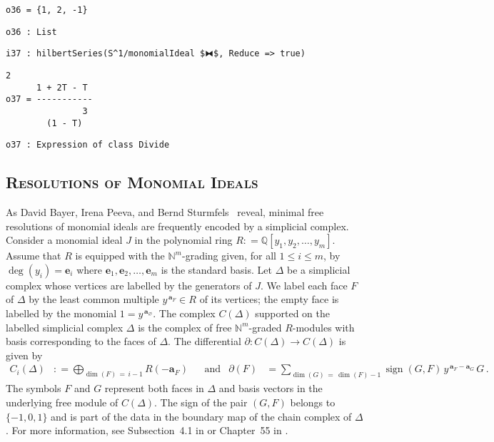 \documentclass[12pt,leqno]{amsart}
\theoremstyle{definition}
\newcommand{\colequal}{\ensuremath{:\!=}}
\begin{document}
\begin{lstlisting}[xleftmargin=10pt, aboveskip=1.5pt, belowskip=1.5pt]
o36 = {1, 2, -1}
\end{lstlisting}
\begin{lstlisting}[xleftmargin=10pt, aboveskip=1.5pt, belowskip=1.5pt]
o36 : List
\end{lstlisting}
\begin{lstlisting}[xleftmargin=10pt, aboveskip=1.5pt, belowskip=1.5pt]
i37 : hilbertSeries(S^1/monomialIdeal $⧓$, Reduce => true)
\end{lstlisting}
\begin{lstlisting}[xleftmargin=10pt, lineskip=-10pt, aboveskip=4pt, belowskip=1pt]
                2
      1 + 2T - T
o37 = -----------
               3
        (1 - T)
\end{lstlisting}
\begin{lstlisting}[xleftmargin=10pt, aboveskip=1.5pt, belowskip=-5.0pt]
o37 : Expression of class Divide
\end{lstlisting}


\subsection*{\scshape\mdseries Resolutions of Monomial Ideals}

As David Bayer, Irena Peeva, and Bernd Sturmfels~\cite{BPS} reveal, minimal
free resolutions of monomial ideals are frequently encoded by a simplicial
complex.  Consider a monomial ideal $J$ in the polynomial ring
$R \colequal \mathbb{Q}[y_1, y_2, \dotsc, y_m]$.  Assume that $R$ is equipped
with the $\mathbb{N}^{m}$-grading given, for all $1 \leqslant i \leqslant m$,
by $\deg(y_i) = \textbf{e}_i$ where
$\textbf{e}_1, \textbf{e}_2, \dotsc, \textbf{e}_m$ is the standard basis.  Let
$\Delta$ be a simplicial complex whose vertices are labelled by the generators
of $J$.  We label each face $F$ of $\Delta$ by the least common multiple
$y^{\,\textbf{a}_{\!F}} \in R$ of its vertices; the empty face is labelled by
the monomial $1 = y^{\,\textbf{a}_{\!\varnothing}}$.  The complex $C(\Delta)$
supported on the labelled simplicial complex $\Delta$ is the complex of free
$\mathbb{N}^m$-graded $R$-modules with basis corresponding to the faces of
$\Delta$.  The differential $\partial \colon\! C(\Delta) \to C(\Delta)$ is
given by
\begin{align*}
  C_i(\Delta)
  &\colequal \bigoplus_{\dim(F) \,=\, i-1} R(-\textbf{a}_F) 
  & & \text{and}
  &\partial(F)
  &= \sum_{\dim(G) \,=\, \dim(F)-1} \operatorname{sign}(G,F) \,
    y^{\,\textbf{a}_{\!F} - \textbf{a}_{\!G}} \, G \, .
\end{align*}
The symbols $F$ and $G$ represent both faces in $\Delta$ and basis vectors in
the underlying free module of $C(\Delta)$.  The sign of the pair $(G,F)$
belongs to $\{-1,0,1\}$ and is part of the data in the boundary map of the
chain complex of $\Delta$.  For more information, see Subsection~4.1 in
\cite{MS} or Chapter~55 in \cite{Peeva}.
\end{document}
